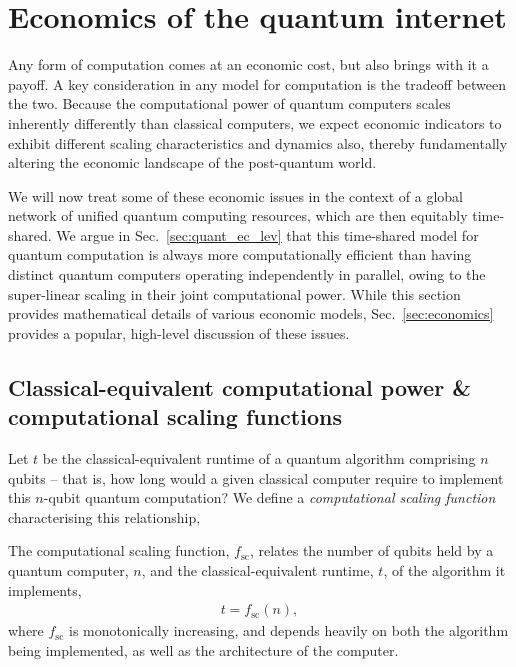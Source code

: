 %
%

\section{Economics of the quantum internet} 

Any form of computation comes at an economic cost, but also brings with it a payoff. A key consideration in any model for computation is the tradeoff between the two. Because the computational power of quantum computers scales inherently differently than classical computers, we expect economic indicators to exhibit different scaling characteristics and dynamics also, thereby fundamentally altering the economic landscape of the post-quantum world.

We will now treat some of these economic issues in the context of a global network of unified quantum computing resources, which are then equitably time-shared. We argue in Sec.~\ref{sec:quant_ec_lev} that this time-shared model for quantum computation is always more computationally efficient than having distinct quantum computers operating independently in parallel, owing to the super-linear scaling in their joint computational power. While this section provides mathematical details of various economic models, Sec.~\ref{sec:economics} provides a popular, high-level discussion of these issues.

%
%

\subsection{Classical-equivalent computational power \& computational scaling functions}

Let $t$ be the classical-equivalent runtime of a quantum algorithm comprising $n$ qubits -- that is, how long would a given classical computer require to implement this $n$-qubit quantum computation? We define a \textit{computational scaling function} characterising this relationship,

\begin{definition} \label{def:scaling_func} 
The computational scaling function, $f_\text{sc}$, relates the number of qubits held by a quantum computer, $n$, and the classical-equivalent runtime, $t$, of the algorithm it implements,
\begin{align}
t = f_\text{sc}(n),
\end{align}
	where $f_\text{sc}$ is monotonically increasing, and depends heavily on both the algorithm being implemented, as well as the architecture of the computer.
\end{definition}

